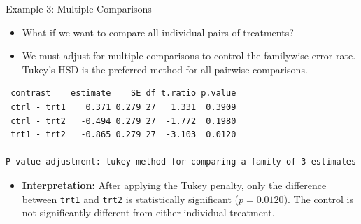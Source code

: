 \begin{frame}{Example 3: Multiple Comparisons}
  \begin{itemize}
    \item What if we want to compare all individual pairs of treatments? 
    \item We must adjust for multiple comparisons to control the familywise error rate. Tukey's HSD is the preferred method for all pairwise comparisons.
  \end{itemize}

\begin{knitrout}\scriptsize
{}\color{fgcolor}\begin{kframe}
\begin{alltt}
 \hlkwb{<-}   \hldef{=} \hldef{)}

\end{alltt}
\begin{verbatim}
 contrast    estimate    SE df t.ratio p.value
 ctrl - trt1    0.371 0.279 27   1.331  0.3909
 ctrl - trt2   -0.494 0.279 27  -1.772  0.1980
 trt1 - trt2   -0.865 0.279 27  -3.103  0.0120

P value adjustment: tukey method for comparing a family of 3 estimates 
\end{verbatim}
\end{kframe}
\end{knitrout}

  \begin{itemize}
    \item \textbf{Interpretation:} After applying the Tukey penalty, only the difference between \texttt{trt1} and \texttt{trt2} is statistically significant ($p = 0.0120$). The control is not significantly different from either individual treatment.
  \end{itemize}
\end{frame}

